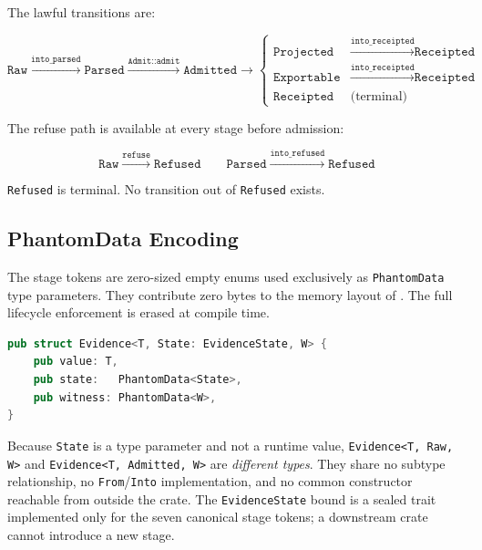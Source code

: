 The lawful transitions are:

\begin{equation}
  \label{eq:lifecycle}
  \texttt{Raw}
  \xrightarrow{\texttt{into\_parsed}}
  \texttt{Parsed}
  \xrightarrow{\texttt{Admit::admit}}
  \texttt{Admitted}
  \xrightarrow{\quad}
  \begin{cases}
    \texttt{Projected}   & \xrightarrow{\texttt{into\_receipted}} \texttt{Receipted} \\
    \texttt{Exportable}  & \xrightarrow{\texttt{into\_receipted}} \texttt{Receipted} \\
    \texttt{Receipted}   & \text{(terminal)}
  \end{cases}
\end{equation}

The refuse path is available at every stage before admission:

\begin{equation}
  \label{eq:refuse}
  \texttt{Raw} \xrightarrow{\texttt{refuse}} \texttt{Refused}
  \qquad
  \texttt{Parsed} \xrightarrow{\texttt{into\_refused}} \texttt{Refused}
\end{equation}

\texttt{Refused} is terminal. No transition out of \texttt{Refused} exists.

\subsection{PhantomData Encoding}

The stage tokens are zero-sized empty enums used exclusively as \texttt{PhantomData}
type parameters. They contribute zero bytes to the memory layout of
. The full lifecycle enforcement is erased at compile time.

\begin{lstlisting}[language=Rust, caption={The \Evidence{}{}{} carrier with
  zero-sized stage and witness tags. \texttt{State} and \texttt{W} are pure
  compile-time phantoms.}, label={lst:evidence-struct}]
pub struct Evidence<T, State: EvidenceState, W> {
    pub value: T,
    pub state:   PhantomData<State>,
    pub witness: PhantomData<W>,
}
\end{lstlisting}

Because \texttt{State} is a type parameter and not a runtime value,
\texttt{Evidence<T, Raw, W>} and \texttt{Evidence<T, Admitted, W>} are
\emph{different types}. They share no subtype relationship, no
\texttt{From}/\texttt{Into} implementation, and no common constructor reachable
from outside the crate. The \texttt{EvidenceState} bound is a sealed trait
implemented only for the seven canonical stage tokens; a downstream crate
cannot introduce a new stage.


